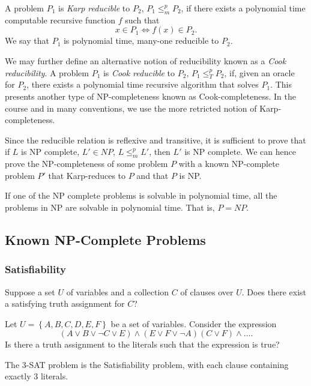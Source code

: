 \begin{definition}
  A problem $P_1$ is \textit{Karp reducible} to $P_2$, $P_1\le _m^{p} P_2$, if
  there exists a polynomial time computable recursive function $f$ such that
  \[x\in P_1\iff f(x)\in P_2.\]
  We say that $P_1$ is polynomial time, many-one reducible to $P_2$.
\end{definition}

\begin{remark}
  We may further define an alternative notion of reducibility known as a
  \textit{Cook reducibility}.  A problem $P_1$ is \textit{Cook reducible} to
  $P_2$, $P_1\le _T^{p} P_2$, if, given an oracle for $P_2$, there exists a
  polynomial time recursive algorithm that solves $P_1$. This presents another
  type of NP-completeness known as Cook-completeness. In the course and in many
  conventions, we use the more retricted notion of Karp-completeness.
\end{remark}

Since the reducible relation is reflexive and transitive, it is sufficient to
prove that if $L$ is NP complete, $L'\in NP$, $L\le^{p}_m L'$, then $L'$ is NP
complete. We can hence prove the NP-completeness of some problem $P$ with a
known NP-complete problem $P'$ that Karp-reduces to $P$ and that $P$ is NP.

\begin{theorem}
  If  one of the NP complete problems is solvable in polynomial time, all the
  problems in NP are solvable in polynomial time. That is, $P=NP$.
\end{theorem}

\subsection{Known NP-Complete Problems}
\subsubsection{Satisfiability} Suppose a set $U$ of variables and a collection $C$
of clauses over $U$. Does there exist a satisfying truth assignment for $C$?
\begin{example}
  Let $U=\left\{ A,B,C,D,E,F \right\} $ be a set of variables. Consider
  the expression
  \[\left( A\vee B \vee \neg C\vee E\right)\wedge \left( E\vee F\vee \neg A
  \right) \left( C\vee F \right) \wedge \ldots.\]
  Is there a truth assignment to the literals such that the expression is true?
\end{example}
The 3-SAT problem is the Satisfiability problem, with each clause containing
exactly 3 literals.


